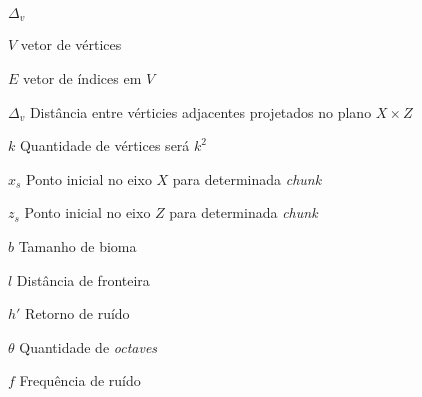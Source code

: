 \documentclass[tg]{mdtuffs}
\begin{document}
\begin{listofsymbols}{$\Delta_{v}$}
    \item [$V$] vetor de vértices
    \item [$E$] vetor de índices em $V$
    \item [$\Delta_{v}$] Distância entre vérticies adjacentes projetados no plano $X \times Z$
    \item [$k$] Quantidade de vértices será $k^2$
    \item [$x_{s}$] Ponto inicial no eixo $X$ para determinada \textit{chunk}
    \item [$z_{s}$] Ponto inicial no eixo $Z$ para determinada \textit{chunk}
    \item [$b$] Tamanho de bioma
    \item [$l$] Distância de fronteira
    \item [$h'$] Retorno de ruído
    \item [$\theta$] Quantidade de \textit{octaves}
    \item [$f$] Frequência de ruído
    
\end{listofsymbols}

\tableofcontents


\setlength{\baselineskip}{1.5\baselineskip}



%




\setlength{\baselineskip}{\baselineskip}

%


\end{document}
